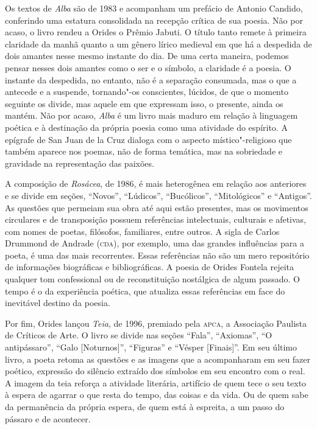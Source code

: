 Os textos de \emph{Alba} são de 1983 e acompanham um prefácio de Antonio
Candido, conferindo uma estatura consolidada na recepção crítica de sua
poesia. Não por acaso, o livro rendeu a Orides o Prêmio Jabuti. O título
tanto remete à primeira claridade da manhã quanto a um gênero lírico
medieval em que há a despedida de dois amantes nesse mesmo instante do
dia. De uma certa maneira, podemos pensar nesses dois amantes como o ser
e o símbolo, a claridade é a poesia. O instante da despedida, no
entanto, não é a separação consumada, mas o que a antecede e a suspende,
tornando"-os conscientes, lúcidos, de que o momento seguinte os divide,
mas aquele em que expressam isso, o presente, ainda os mantém. Não por
acaso, \emph{Alba} é um livro mais maduro em relação à linguagem poética
e à destinação da própria poesia como uma atividade do espírito. A
epígrafe de San Juan de la Cruz dialoga com o aspecto místico"-religioso
que também aparece nos poemas, não de forma temática, mas na sobriedade
e gravidade na representação das paixões.

A composição de \emph{Rosácea}, de 1986, é mais heterogênea em relação
aos anteriores e se divide em seções, ``Novos'', ``Lúdicos'',
``Bucólicos'', ``Mitológicos'' e ``Antigos''. As questões que permeiam
sua obra até aqui estão presentes, mas os movimentos circulares e de
transposição possuem referências intelectuais, culturais e afetivas, com
nomes de poetas, filósofos, familiares, entre outros. A sigla de Carlos
Drummond de Andrade (\textsc{cda}), por exemplo, uma das grandes influências para
a poeta, é uma das mais recorrentes. Essas referências não são um mero
repositório de informações biográficas e bibliográficas. A poesia de
Orides Fontela rejeita qualquer tom confessional ou de reconstituição
nostálgica de algum passado. O tempo é o da experiência poética, que
atualiza essas referências em face do inevitável destino da poesia.

Por fim, Orides lançou \emph{Teia}, de 1996, premiado pela \textsc{apca}, a
Associação Paulista de Críticos de Arte. O livro se divide nas seções
``Fala'', ``Axiomas'', ``O antipássaro'', ``Galo {[}Noturnos{]}'',
``Figuras'' e ``Vésper {[}Finais{]}''. Em seu último livro, a poeta
retoma as questões e as imagens que a acompanharam em seu fazer poético,
expressão do silêncio extraído dos símbolos em seu encontro com o real.
A imagem da teia reforça a atividade literária, artifício de quem tece o
seu texto à espera de agarrar o que resta do tempo, das coisas e da
vida. Ou de quem sabe da permanência da própria espera, de quem está à
espreita, a um passo do pássaro e de acontecer.

